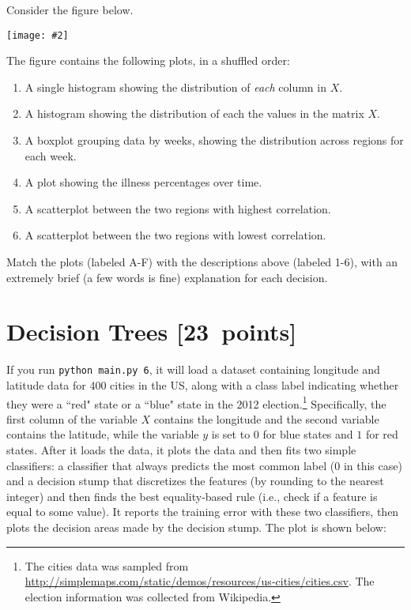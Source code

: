 \documentclass{article}
\newcommand{\blu}[1]{{\textcolor{blu}{#1}}}
\let\ask\blu
\newcommand\pts[1]{\textcolor{pointscolour}{[#1~points]}}
\newcommand{\centerfig}[2]{\begin{center}\texttt{[image: \#2]}\end{center}}
\begin{document}
  Consider the figure below.

  \centerfig{.9}{./figs/visualize-unlabeled}
  \newpage
  The figure contains the following plots, in a shuffled order:
  \begin{enumerate}
  \item A single histogram showing the distribution of \emph{each} column in $X$.
  \item A histogram showing the distribution of each the values in the matrix $X$.
  \item A boxplot grouping data by weeks, showing the distribution across regions for each week.
  \item A plot showing the illness percentages over time.
  \item A scatterplot between the two regions with highest correlation.
  \item A scatterplot between the two regions with lowest correlation.
  \end{enumerate}

  \ask{Match the plots (labeled A-F) with the descriptions above (labeled 1-6), with an extremely brief (a few words is fine) explanation for each decision.}





  \clearpage\section{Decision Trees \pts{23}}

  If you run \texttt{python main.py 6}, it will load a dataset containing longitude
  and latitude data for 400 cities in the US, along with a class label indicating
  whether they were a ``red" state or a ``blue" state in the 2012
  election.\footnote{The cities data was sampled from \url{http://simplemaps.com/static/demos/resources/us-cities/cities.csv}. The election information was collected from Wikipedia.}
  Specifically, the first column of the variable $X$ contains the
  longitude and the second variable contains the latitude,
  while the variable $y$ is set to $0$ for blue states and $1$ for red states.
  After it loads the data, it plots the data and then fits two simple
  classifiers: a classifier that always predicts the
  most common label ($0$ in this case) and a decision stump
  that discretizes the features (by rounding to the nearest integer)
  and then finds the best equality-based rule (i.e., check
  if a feature is equal to some value).
  It reports the training error with these two classifiers, then plots the decision areas made by the decision stump.
  The plot is shown below:
\end{document}
